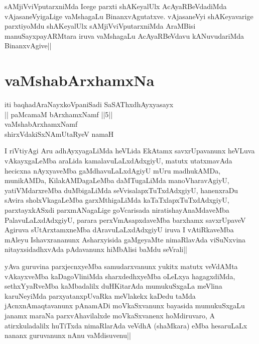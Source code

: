 \begin{artha}
sAMjiVviVputarxniMda Icege parxti shAKeyalUlx AcAyaRBeVdadiMda 
vAjasaneVyigaLige vaMshagaLu BinanxvAgutatxve. vAjasaneVyi 
shAKeyavarige parxtiyoMdu shAKeyalUlx sAMjiVviVputarxniMda 
AraMBisi manuSayxpayARMtara iruva vaMshagaLu AcAyaRBeVdavu 
kANuvudariMda BinanxvAgive||
\end{artha}

\section*{vaMshabArxhamxNa}

\stext

\stext

\stext

\stext

\begin{center}
iti baqhadAraNayxkoVpaniSadi SaSAThxdhAyxyasayx\\
|| paMcamaM bArxhamxNamf ||5||\\
vaMshabArxhamxNamf\\
shirxVdakiSxNAmUtaRyeV namaH
\end{center}


\begin{artha}
I riVtiyAgi Aru adhAyxyagaLiMda heVLida EkAtamx savxrUpavanunx heVLuva 
vAkayxgaLeMba araLida kamalavuLaLxdAdxgiyU, matutx utatxmavAda 
hecicxna nAyxyaveMba gaMdhavuLaLxdAgiyU mUru madhukAMDa, munikAMDa, 
KilakAMDagaLeMba daMTugaLiMda manoVharavAgiyU, yatiVMdarxreMba 
duMbigaLiMda seVvisalapxTuTxdAdxgiyU, hanenxraDu sAvira 
sholxVkagaLeMba garxMthigaLiMda kaTaTxlapxTuTxdAdxgiyU, parxtayxkASxdi 
parxmANagaLige goVcarisada niratishayAnaMdaveMba PalavuLaLxdAdxgiyU, 
parara perxVmAsapxdaveMba barxhamx savxrUpaveV Agiruva sUtArxtamxneMba 
dAravuLaLxdAdxgiyU iruva I vAtiRkaveMba mAleyu Ishavxrananunx 
Asharxyisida gaMgeyaMte nimaRlavAda viSuNxvina nitayxsidadhxvAda 
pAdavanunx hiMbAlisi baMdu seVrali||
\end{artha}

\begin{artha}
yAva guruvina parxjecnxyeMba samudarxvanunx yukitx matutx veVdAMta 
vAkayxveMba kaDagoVliniMda sharxdedhxyeMba oLeLxya hagagxdiMda, 
sethxYyaRveMba kaMbadalilx duHKitarAda mumukuSxgaLa meVlina 
karuNeyiMda parxyatanxpUvaRka meVlakekx kaDedu taMda 
jAcnxnAmaqtavanunx pAnamADi moVkaSxvanunx bayasida mumukuSxgaLu janamx 
maraNa parxvAhavilalxde moVkaSxvanenx hoMdiruvaro, A atirxkuladalilx 
huTiTxda nimaRlarAda veVdhA (shaMkara) eMba hesaruLaLx nananx 
guruvanunx nAnu vaMdisuvenu||
\end{artha}

